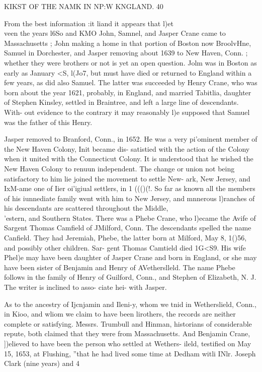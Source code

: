 \documentclass{book}
\begin{document}
KIKST OF THE NAMK IN NP:W KNGLAND. 40 

From the best information :it liand it appears that l)et\\veen the 
years l6So and KMO John, Samnel, and Jasper Crane came to 
Massachusetts ; John making a home in that portion of Boston 
now BroolvHne, Samuel in Dorchester, and Jasper removing 
about 1639 to New Haven, Conn. ; whether they were brothers 
or not is yet an open question. Jolm was in Boston as early as 
January <S, l(Jo7, but must have died or returned to England 
within a few years, as did also Samuel. The latter was succeeded 
by Henry Crane, who was born about the year 1621, probably, 
in England, and married Tabitlia, daughter of Stephen Kinsley, 
settled in Braintree, and left a large line of descendants. With- 
out evidence to the contrary it may reasonably l)e supposed that 
Samuel was the father of this Henry. 

Jasper removed to Branford, Conn., in 1652. He was a very 
pi'ominent member of the New Haven Colony, Init became dis- 
satistied with the action of the Colony when it united with the 
Connecticut Colony. It is understood that he wished the New 
Haven Colony to renuun independent. The change or union not 
being satisfactory to him lie joined the movement to settle New- 
ark, New Jersey, and IxM-ame one of Iier oi'igiual settlers, in 
1 ((()(!. So far as known all the members of his iunnediate family 
went with him to New Jersey, and mnnerous l)ranches of his 
descendants are scattered throughout the Middle, \^\\'estern, and 
Southern States. There was a Phebe Crane, who l)ecame the Avife 
of Sargent Thomas Camfield of JMilford, Conn. The descendants 
spelled the name Canfield. They had Jeremiah, Phebe, the latter 
born at Milford, May 8, 1()56, and possibly other children. Sar- 
gent Thomas Camtield died 1G<S9. His wife Phel)e may have 
been daughter of Jasper Crane and born in England, or she may 
have been sister of Benjamin and Henry of AVetherslleld. The 
name Phebe follows in the family of Henry of Guilford, Conn., 
and Stephen of Elizabeth, N. J. The writer is inclined to asso- 
ciate hei- with Jasper. 

As to the ancestry of Ijcnjamin and Ileni-y, whom we tnid in 
Wetherslield, Conn., in Kioo, and wliom we claim to have been 
lirothers, the records are neither complete or satisfying. \^Messrs. 
Trumbull and Hinman, historians of considerable repute, both 
claimed that they were from Massachusetts. And Benjamin 
Crane, ])elieved to have been the person who settled at Wethers- 
ileld, testified on May 15, 1653, at Flushing, ''that he had lived 
some time at Dedham witli INlr. Joseph Clark (nine years) and 
4 
\end{document}
